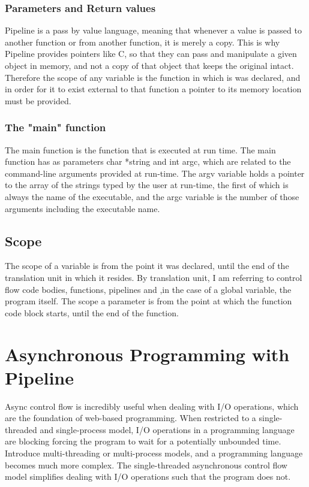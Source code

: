 \documentclass[./LRM_main.tex]{subfiles}
\begin{document}
\subsubsection{Parameters and Return values}
Pipeline is a pass by value language, meaning that whenever a value is passed to another function or from another function, it is merely a copy. This is why Pipeline provides pointers like C, so that they can pass and manipulate a given object in memory, and not a copy of that object that keeps the original intact. Therefore the scope of any variable is the function in which is was declared, and in order for it to exist external to that function a pointer to its memory location must be provided.
\subsubsection{The "main" function}
The main function is the function that is executed at run time. The main function has as parameters char *string and int argc, which are related to the command-line arguments provided at run-time. The argv variable holds a pointer to the array of the strings typed by the user at run-time, the first of which is always the name of the executable, and the argc variable is the number of those arguments including the executable name.
\subsection{Scope}
The scope of a variable is from the point it was declared, until the end of the translation unit in which it resides. By translation unit, I am referring to control flow code bodies, functions, pipelines and ,in the case of a global variable, the program itself. The scope a parameter is from the point at which the function code block starts, until the end of the function.
\section{Asynchronous Programming with Pipeline}
Async control flow is incredibly useful when dealing with I/O operations, which are the foundation of web-based programming. When restricted to a single-threaded and single-process model, I/O operations in a programming language are blocking forcing the program to wait for a potentially unbounded time. Introduce multi-threading or multi-process models, and a programming language becomes much more complex. The single-threaded asynchronous control flow model simplifies dealing with I/O operations such that the program does not.
\end{document}
